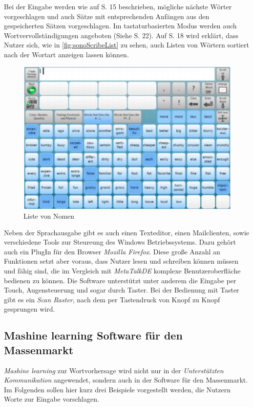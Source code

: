             Bei der Eingabe werden wie auf S. 15 beschrieben, mögliche nächste Wörter vorgeschlagen und auch Sätze mit entsprechenden Anfängen aus den gespeicherten Sätzen vorgeschlagen. Im tastaturbasierten Modus werden auch Wortvervollständigungen angeboten (Siehe S. 22). Auf S. 18 wird erklärt, dass Nutzer sich, wie in \autoref{fig:sonoScribeList} zu sehen, auch Listen von Wörtern sortiert nach der Wortart anzeigen lassen können.
            
            \begin{figure}[H]
  				\centering
  				\includegraphics[width=.6\linewidth]{images/SonoScribeList.png}
  				\caption{Liste von Nomen \parencite[S. 18]{tobii:sonoScribeManual}}
                \label{fig:sonoScribeList}
			\end{figure}
            
			Neben der Sprachausgabe gibt es auch einen Texteditor, einen Mailclienten, sowie verschiedene Tools zur Steureung des Windows Betriebssystems. Dazu gehört auch ein PlugIn für den Browser \emph{Mozilla Firefox}. Diese große Anzahl an Funktionen setzt aber voraus, dass Nutzer lesen und schreiben können müssen und fähig sind, die im Vergleich mit \emph{MetaTalkDE} komplexe Benutzeroberfläche bedienen zu können. Die Software unterstützt unter anderem die Eingabe per Touch, Augensteuerung und sogar durch Taster. Bei der Bedienung mit Taster gibt es ein \emph{Scan Raster}, nach dem per Tastendruck von Knopf zu Knopf gesprungen wird.
    
    \newpage
	\subsection{Mashine learning Software für den Massenmarkt}
    \emph{Mashine learning} zur Wortvorhersage wird nicht nur in der \emph{Unterstützten Kommunikation} angewendet, sondern auch in der Software für den Massenmarkt. Im Folgenden sollen hier kurz drei Beispiele vorgestellt werden, die Nutzern Worte zur Eingabe vorschlagen.
        
